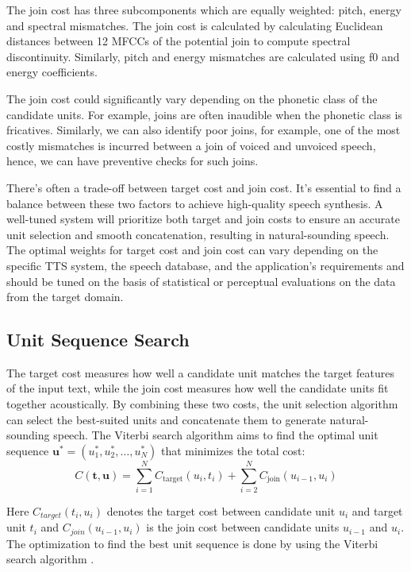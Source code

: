 \documentclass[lettersize,journal]{IEEEtran}
\begin{document}
 The join cost has three subcomponents which are equally weighted: pitch, energy and spectral mismatches. The join cost is calculated by calculating Euclidean distances between 12 MFCCs of the potential join to compute spectral discontinuity. Similarly, pitch and energy mismatches are calculated using f0 and energy coefficients. 
 
 The join cost could significantly vary depending on the phonetic class of the candidate units. For example, joins are often inaudible when the phonetic class is fricatives. Similarly, we can also identify poor joins, for example, one of the most costly mismatches is incurred between a join of voiced and unvoiced speech, hence, we can have preventive checks for such joins.  
 
 There's often a trade-off between target cost and join cost. It's essential to find a balance between these two factors to achieve high-quality speech synthesis. A well-tuned system will prioritize both target and join costs to ensure an accurate unit selection and smooth concatenation, resulting in natural-sounding speech. The optimal weights for target cost and join cost can vary depending on the specific TTS system, the speech database, and the application's requirements and should be tuned on the basis of statistical or perceptual evaluations on the data from the target domain.
 
\subsection{Unit Sequence Search}

The target cost measures how well a candidate unit matches the target features of the input text, while the join cost measures how well the candidate units fit together acoustically. By combining these two costs, the unit selection algorithm can select the best-suited units and concatenate them to generate natural-sounding speech. The Viterbi search algorithm aims to find the optimal unit sequence $\mathbf{u}^* = (u_1^*, u_2^*, \dots, u_N^*)$ that minimizes the total cost:
\begin{equation}
  C(\textbf{t}, \textbf{u}) = \sum_{i=1}^{N} C_{\text{target}}(u_i, t_i) + \sum_{i=2}^{N} C_{\text{join}}(u_{i-1}, u_i)
\end{equation}

Here $C_{target}(t_i,u_i)$ denotes the target cost between candidate unit $u_i$ and target unit $t_i$ and $C_{join}(u_{i-1}, u_i)$ is the join cost between candidate units $u_{i-1}$ and $u_i$. The optimization to find the best unit sequence is done by using the Viterbi search algorithm \cite{htk_book}. 
\end{document}
